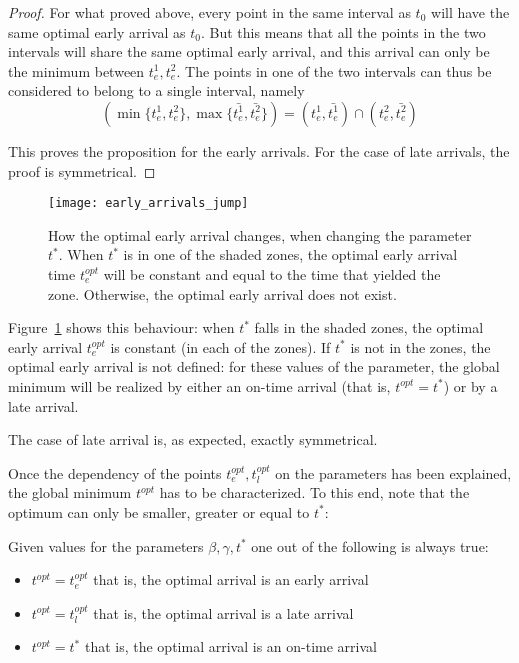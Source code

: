 \begin{proof}
  For what proved above,
  every point in the same interval as \(t_0\) will have the same optimal early arrival as \(t_0\).
  But this means that all the points in the two intervals will share the same optimal early arrival,
  and this arrival can only be the minimum between \(t_e^1, t_e^2\).
  The points in one of the two intervals can thus be considered to belong to a single interval,
  namely
  \begin{equation*}
    (\min\{t_e^1, t_e^2\}, \max\{\bar{t_e^1}, \bar{t_e^2}\}) = (t_e^1, \bar{t_e^1}) \cap (t_e^2, \bar{t_e^2})
  \end{equation*}

  This proves the proposition for the early arrivals.
  For the case of late arrivals,
  the proof is symmetrical.
\end{proof}

\begin{figure}
  \centering
  \texttt{[image: early\_arrivals\_jump]}
  \caption{How the optimal early arrival changes,
    when changing the parameter \(t^*\).
    When \(t^*\) is in one of the shaded zones,
    the optimal early arrival time \(t_e^{opt}\) will be constant and equal to the time that yielded the zone.
  Otherwise, the optimal early arrival does not exist.}
  \label{fig:early_arrivals_jump}
\end{figure}

Figure~\ref{fig:early_arrivals_jump} shows this behaviour:
when \(t^*\) falls in the shaded zones,
the optimal early arrival \(t_e^{opt}\) is constant (in each of the zones).
If \(t^*\) is not in the zones,
the optimal early arrival is not defined:
for these values of the parameter,
the global minimum will be realized by either an on-time arrival (that is, \(t^{opt} = t^*\))
or by a late arrival.

The case of late arrival is, as expected, exactly symmetrical.

Once the dependency of the points \(t_e^{opt}, t_l^{opt}\) on the parameters has been explained,
the global minimum \(t^{opt}\) has to be characterized.
To this end, note that the optimum can only be smaller, greater or equal to \(t^*\):
\begin{obs}
  \label{obs:t_opt-dep}
  Given values for the parameters \(\beta, \gamma, t^*\) one out of the following is always true:
  \begin{itemize}
  \item \(t^{opt} = t_e^{opt}\) that is, the optimal arrival is an early arrival
  \item \(t^{opt} = t_l^{opt}\) that is, the optimal arrival is a late arrival
  \item \(t^{opt} = t^*\) that is, the optimal arrival is an on-time arrival
  \end{itemize}
\end{obs}

